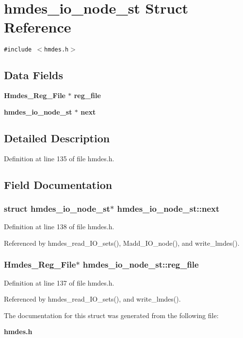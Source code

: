 \section{hmdes\_\-io\_\-node\_\-st Struct Reference}
\label{structhmdes__io__node__st}
{\tt \#include $<$hmdes.h$>$}

\subsection*{Data Fields}
\begin{CompactItemize}
\item 
\bf{Hmdes\_\-Reg\_\-File} $\ast$ \bf{reg\_\-file}
\item 
\bf{hmdes\_\-io\_\-node\_\-st} $\ast$ \bf{next}
\end{CompactItemize}


\subsection{Detailed Description}




Definition at line 135 of file hmdes.h.

\subsection{Field Documentation}
\subsubsection{\setlength{\rightskip}{0pt plus 5cm}struct \bf{hmdes\_\-io\_\-node\_\-st}$\ast$ \bf{hmdes\_\-io\_\-node\_\-st::next}}\label{structhmdes__io__node__st_35fa6e1f8aae5172c6b8c2813d3cbbf0}




Definition at line 138 of file hmdes.h.

Referenced by hmdes\_\-read\_\-IO\_\-sets(), Madd\_\-IO\_\-node(), and write\_\-lmdes().
\subsubsection{\setlength{\rightskip}{0pt plus 5cm}\bf{Hmdes\_\-Reg\_\-File}$\ast$ \bf{hmdes\_\-io\_\-node\_\-st::reg\_\-file}}\label{structhmdes__io__node__st_5ad6671c5124be7d88edb918f88bedb8}




Definition at line 137 of file hmdes.h.

Referenced by hmdes\_\-read\_\-IO\_\-sets(), and write\_\-lmdes().

The documentation for this struct was generated from the following file:\begin{CompactItemize}
\item 
\bf{hmdes.h}\end{CompactItemize}
